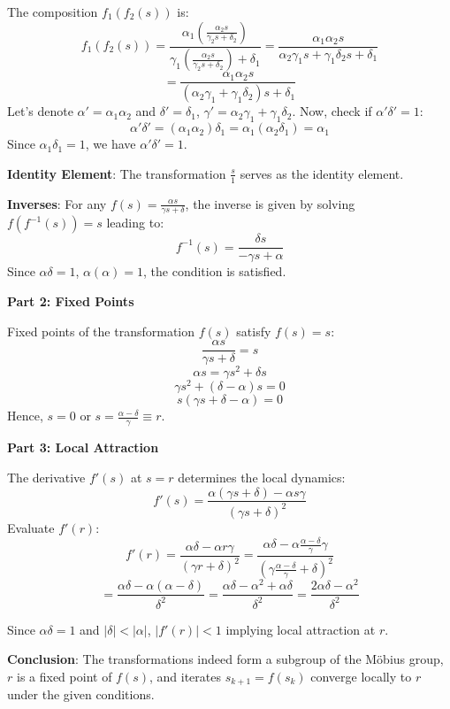 \documentclass[8pt]{article}
\begin{document}
The composition \( f_1(f_2(s)) \) is:
\[ f_1(f_2(s)) = \frac{\alpha_1 \left(\frac{\alpha_2 s}{\gamma_2 s + \delta_2}\right)}{\gamma_1 \left(\frac{\alpha_2 s}{\gamma_2 s + \delta_2}\right) + \delta_1} = \frac{\alpha_1 \alpha_2 s}{\alpha_2 \gamma_1 s + \gamma_1 \delta_2 s + \delta_1} \]
\[ = \frac{\alpha_1 \alpha_2 s}{(\alpha_2 \gamma_1 + \gamma_1 \delta_2) s + \delta_1} \]
Let's denote \( \alpha' = \alpha_1 \alpha_2 \) and \( \delta' = \delta_1 \), \( \gamma' = \alpha_2 \gamma_1 + \gamma_1 \delta_2 \). Now, check if \( \alpha' \delta' = 1 \):
\[ \alpha' \delta' = (\alpha_1 \alpha_2) \delta_1 = \alpha_1 (\alpha_2 \delta_1) = \alpha_1 \]
Since \( \alpha_1 \delta_1 = 1 \), we have \( \alpha' \delta' = 1 \).

\textbf{Identity Element}: The transformation \( \frac{s}{1} \) serves as the identity element.

\textbf{Inverses}: For any \( f(s) = \frac{\alpha s}{\gamma s + \delta} \), the inverse is given by solving \( f(f^{-1}(s)) = s \) leading to:
\[ f^{-1}(s) = \frac{\delta s}{-\gamma s + \alpha} \]
Since \( \alpha \delta = 1 \), \( \alpha (\alpha) = 1 \), the condition is satisfied.

\textbf{Part 2: Fixed Points}

Fixed points of the transformation \( f(s) \) satisfy \( f(s) = s \):
\[ \frac{\alpha s}{\gamma s + \delta} = s \]
\[ \alpha s = \gamma s^2 + \delta s \]
\[ \gamma s^2 + (\delta - \alpha) s = 0 \]
\[ s(\gamma s + \delta - \alpha) = 0 \]
Hence, \( s = 0 \) or \( s = \frac{\alpha - \delta}{\gamma} \equiv r \).

\textbf{Part 3: Local Attraction}

The derivative \( f'(s) \) at \( s = r \) determines the local dynamics:
\[ f'(s) = \frac{\alpha (\gamma s + \delta) - \alpha s \gamma}{(\gamma s + \delta)^2} \]
Evaluate \( f'(r) \):
\[ f'(r) = \frac{\alpha \delta - \alpha r \gamma}{(\gamma r + \delta)^2} = \frac{\alpha \delta - \alpha \frac{\alpha - \delta}{\gamma} \gamma}{(\gamma \frac{\alpha - \delta}{\gamma} + \delta)^2} \]
\[ = \frac{\alpha \delta - \alpha (\alpha - \delta)}{\delta^2} = \frac{\alpha \delta - \alpha^2 + \alpha \delta}{\delta^2} = \frac{2\alpha \delta - \alpha^2}{\delta^2} \]

Since \( \alpha \delta = 1 \) and \( |\delta| < |\alpha| \), \( |f'(r)| < 1 \) implying local attraction at \( r \).

\textbf{Conclusion}: The transformations indeed form a subgroup of the Möbius group, \( r \) is a fixed point of \( f(s) \), and iterates \( s_{k+1} = f(s_k) \) converge locally to \( r \) under the given conditions.
\end{document}
